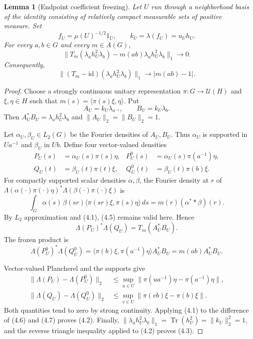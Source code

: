 \documentclass[11pt]{article}
\newtheorem{lemma}[theorem]{Lemma}
\newcommand{\Tr}{\operatorname{Tr}}
\newcommand{\id}{\mathrm{id}}
\begin{document}
\begin{lemma}[Endpoint coefficient freezing]\label{lem:freeze}
Let \(U\) run through a neighborhood basis of the identity consisting of
relatively compact measurable sets of positive measure.  Set
\[
 f_U=\mu(U)^{-1/2}1_U,\qquad k_U=\lambda(f_U)=u_Uh_U.
\]
For every \(a,b\in G\) and every \(m\in A(G)\),
\[
 \big\|T_m(\lambda_a h_U^2\lambda_b)
      -m(ab)\lambda_a h_U^2\lambda_b\big\|_1\longrightarrow0.       \tag{4.2}
\]
Consequently,
\[
 \big\|(T_m-\id)(\lambda_a h_U^2\lambda_b)\big\|_1
 \longrightarrow |m(ab)-1|.                                      \tag{4.3}
\]
\end{lemma}

\begin{proof}
Choose a strongly continuous unitary representation \(\pi:G\to\mathcal
U(H)\) and \(\xi,\eta\in H\) such that
\(m(s)=\langle\pi(s)\xi,\eta\rangle\).  Put
\[
 A_U=k_U\lambda_{a^{-1}},\qquad B_U=k_U\lambda_b.
\]
Then \(A_U^*B_U=\lambda_a h_U^2\lambda_b\) and
\(\|A_U\|_2=\|B_U\|_2=1\).

Let \(\alpha_U,\beta_U\in L_2(G)\) be the Fourier densities of \(A_U,B_U\).
Thus \(\alpha_U\) is supported in \(Ua^{-1}\) and \(\beta_U\) in \(Ub\).
Define four vector-valued densities
\[
\begin{aligned}
 P_U(s)&=\alpha_U(s)\pi(s)\eta,&
 P_U^0(s)&=\alpha_U(s)\pi(a^{-1})\eta,\\
 Q_U(t)&=\beta_U(t)\pi(t)\xi,&
 Q_U^0(t)&=\beta_U(t)\pi(b)\xi.
\end{aligned}                                                       \tag{4.4}
\]
For compactly supported scalar densities \(\alpha,\beta\), the Fourier
density at \(r\) of
\(\Lambda(\alpha(\cdot)\pi(\cdot)\eta)^*
  \Lambda(\beta(\cdot)\pi(\cdot)\xi)\)
is
\[
 \int_G \overline{\alpha(s)}\,\beta(sr)
 \langle\pi(sr)\xi,\pi(s)\eta\rangle\,ds
 =m(r)(\alpha^**\beta)(r).                                        \tag{4.5}
\]
By \(L_2\) approximation and (4.1), (4.5) remains valid here.  Hence
\[
 \Lambda(P_U)^*\Lambda(Q_U)=T_m(A_U^*B_U).                          \tag{4.6}
\]
The frozen product is
\[
 \Lambda(P_U^0)^*\Lambda(Q_U^0)
 =\langle\pi(b)\xi,\pi(a^{-1})\eta\rangle A_U^*B_U
 =m(ab)A_U^*B_U.                                                    \tag{4.7}
\]

Vector-valued Plancherel and the supports give
\[
\begin{aligned}
 \|\Lambda(P_U)-\Lambda(P_U^0)\|_2
 &\le \sup_{u\in U}
    \|\pi(ua^{-1})\eta-\pi(a^{-1})\eta\|,\\
 \|\Lambda(Q_U)-\Lambda(Q_U^0)\|_2
 &\le \sup_{v\in U}
    \|\pi(vb)\xi-\pi(b)\xi\|.
\end{aligned}
\tag{4.8}
\]
Both quantities tend to zero by strong continuity.  Applying (4.1) to the
difference of (4.6) and (4.7) proves (4.2).  Finally,
\(\|\lambda_a h_U^2\lambda_b\|_1=\Tr(h_U^2)=\|k_U\|_2^2=1\), and the
reverse triangle inequality applied to (4.2) proves (4.3).
\end{proof}
\end{document}
